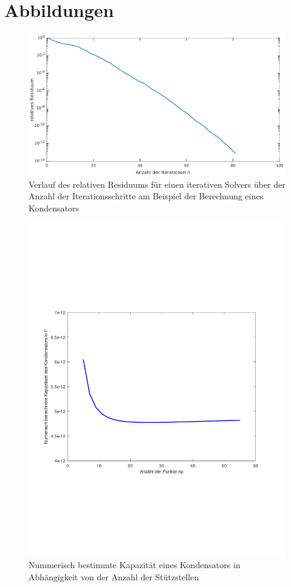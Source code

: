 \documentclass[Protokollheft.tex]{subfiles}
\begin{document}
\section{Abbildungen}
\begin{figure}[h!]
	\centering
	\includegraphics[width=0.7\linewidth]{ResidiumIterationenGraph.pdf}
	\caption{Verlauf des relativen Residuums für einen iterativen Solvers über der Anzahl der Iterationsschritte am Beispiel der Berechnung eines Kondensators}
	\label{fig:residiumiIterationen}
\end{figure}

\begin{figure}[h!]
	\centering
	\includegraphics[trim = 20mm 70mm 20mm 70mm, clip,width=0.7\linewidth]{KapazitaetUeberAnzStuetzstellen.pdf}
	\caption{Nummerisch bestimmte Kapazität eines Kondensators in Abhängigkeit von der Anzahl der Stützstellen}
	\label{fig:kapazitaetueberanzstuetzstellen}
\end{figure}
\end{document}
